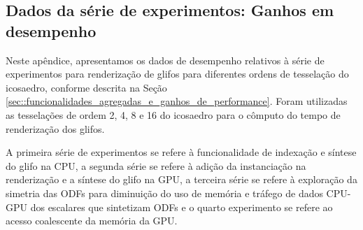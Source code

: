 \documentclass[
    12pt,                %
    oneside,            %
    a4paper,            %
    english,            %
    french,                %
    spanish,            %
    brazil                %
    ]{abntex2}
\begin{document}
%


%
%


\begin{apendicesenv}
\chapter{Dados da série de experimentos: Ganhos em desempenho}
\label{ap::dados_serie_experimentos_1}

Neste apêndice, apresentamos os dados de desempenho relativos à série de experimentos para renderização de glifos para diferentes ordens de tesselação do icosaedro, conforme descrita na Seção \ref{sec::funcionalidades_agregadas_e_ganhos_de_performance}. Foram utilizadas as tesselações de ordem 2, 4, 8 e 16 do icosaedro para o cômputo do tempo de renderização dos glifos.

A primeira série de experimentos se refere à funcionalidade de indexação e síntese do glifo na CPU, a segunda série se refere à adição da instanciação na renderização e a síntese do glifo na GPU, a terceira série se refere à exploração da simetria das ODFs para diminuição do uso de memória e tráfego de dados CPU-GPU dos escalares que sintetizam ODFs e o quarto experimento se refere ao acesso coalescente da memória da GPU.


\end{apendicesenv}
\end{document}
